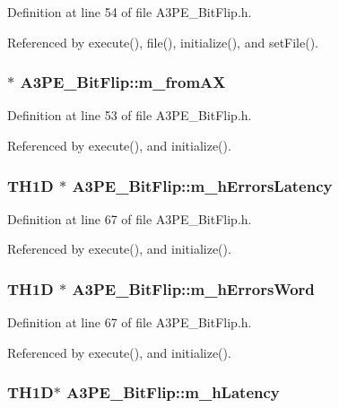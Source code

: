 Definition at line 54 of file A3PE\_\-BitFlip.h.

Referenced by execute(), file(), initialize(), and setFile().\hypertarget{classA3PE__BitFlip_aad9a62adac072bed5de87406ce4cd77d}{
\subsubsection[{m\_\-fromAX}]{$\ast$ {\bf A3PE\_\-BitFlip::m\_\-fromAX}}}
\label{classA3PE__BitFlip_aad9a62adac072bed5de87406ce4cd77d}


Definition at line 53 of file A3PE\_\-BitFlip.h.

Referenced by execute(), and initialize().\hypertarget{classA3PE__BitFlip_a4dec854e8123271c9a624ca46c50dfd5}{
\subsubsection[{m\_\-hErrorsLatency}]{\setlength{\rightskip}{0pt plus 5cm}TH1D $\ast$ {\bf A3PE\_\-BitFlip::m\_\-hErrorsLatency}}}
\label{classA3PE__BitFlip_a4dec854e8123271c9a624ca46c50dfd5}


Definition at line 67 of file A3PE\_\-BitFlip.h.

Referenced by execute(), and initialize().\hypertarget{classA3PE__BitFlip_a0d9ea71af465c060689be4c05cba9a8e}{
\subsubsection[{m\_\-hErrorsWord}]{\setlength{\rightskip}{0pt plus 5cm}TH1D $\ast$ {\bf A3PE\_\-BitFlip::m\_\-hErrorsWord}}}
\label{classA3PE__BitFlip_a0d9ea71af465c060689be4c05cba9a8e}


Definition at line 67 of file A3PE\_\-BitFlip.h.

Referenced by execute(), and initialize().\hypertarget{classA3PE__BitFlip_a83928ea28c555c19f4e95cf7863c1b0c}{
\subsubsection[{m\_\-hLatency}]{\setlength{\rightskip}{0pt plus 5cm}TH1D$\ast$ {\bf A3PE\_\-BitFlip::m\_\-hLatency}}}
\label{classA3PE__BitFlip_a83928ea28c555c19f4e95cf7863c1b0c}


